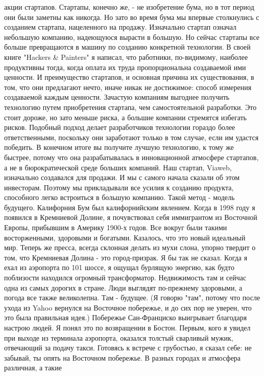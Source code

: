 \documentclass[ebook,12pt,oneside,openany]{memoir}
\begin{document}
акции стартапов. Стартапы, конечно же, - не изобретение бума, но в тот
период они были заметны как никогда. Но зато во время бума мы впервые
столкнулись с созданием стартапа, нацеленного на продажу. Изначально
стартап означал небольшую компанию, надеющуюся вырасти в большую. Но
сейчас стартапы все больше превращаются в машину по созданию
конкретной технологии. В своей книге "Hackers \& Painters" я написал,
что работники, по-видимому, наиболее продуктивны тогда, когда оплата
их труда пропорциональна создаваемой ими ценности. И преимущество
стартапов, и основная причина их существования, в том, что они
предлагают нечто, иначе никак не достижимое: способ измерения
создаваемой каждым ценности. Зачастую компаниям выгоднее получить
технологию путем приобретения стартапа, чем самостоятельной
разработки. Это стоит дороже, но зато меньше риска, а большие компании
стремятся избегать рисков. Подобный подход делает разработчиков
технологии гораздо более ответственными, поскольку они заработают
только в том случае, если им удастся победить. В конечном итоге вы
получите лучшую технологию, к тому же быстрее, потому что она
разрабатывалась в инновационной атмосфере стартапов, а не в
бюрократической среде больших компаний. Наш стартап, Viaweb,
изначально создавался для продажи. И мы с самого начала сказали об
этом инвесторам. Поэтому мы прикладывали все усилия к созданию
продукта, способного легко встроиться в большую компанию. Такой метод
- модель будущего. Калифорния Бум был калифорнийским явлением. Когда в
1998 году я появился в Кремниевой Долине, я почувствовал себя
иммигрантом из Восточной Европы, прибывшим в Америку 1900-х годов. Все
вокруг были такими восторженными, здоровыми и богатыми. Казалось, что
это новый идеальный мир. Теперь же пресса, всегда склонная делать из
мухи слона, упорно твердит о том, что Кремниевая Долина - это
город-призрак. Я бы так не сказал. Когда я ехал из аэропорта по 101
шоссе, я ощущал бурлящую энергию, как будто поблизости находился
огромный трансформатор. Недвижимость там и сейчас одна из самых
дорогих в стране. Люди выглядят по-прежнему здоровыми, а погода все
также великолепна. Там - будущее. (Я говорю "там", потому что после
ухода из Yahoo вернулся на Восточное побережье, и до сих пор не
уверен, что это была правильная идея.) Побережье Сан-Франциско
выигрывает благодаря настрою людей. Я понял это по возвращении в
Бостон. Первым, кого я увидел при выходе из терминала аэропорта,
оказался толстый сварливый мужик, отвечающий за подачу такси. Готовясь
к встрече с грубостью, я сказал себе: не забывай, ты опять на
Восточном побережье. В разных городах и атмосфера различная, а такие
\end{document}
